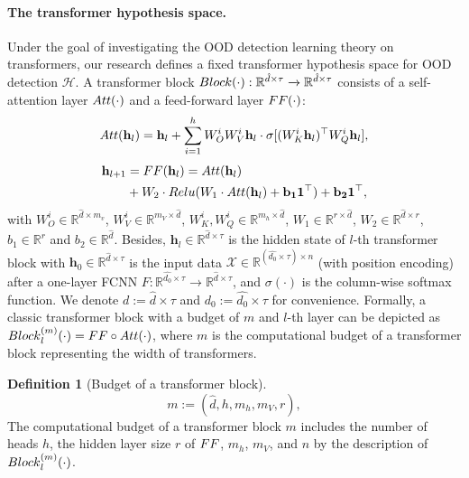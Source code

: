 \documentclass{article}
\theoremstyle{plain}
\theoremstyle{definition}
\newtheorem{definition}[theorem]{Definition}
\theoremstyle{remark}
\begin{document}
\paragraph{The transformer hypothesis space. }
Under the goal of investigating the OOD detection learning theory on transformers, our research defines a fixed transformer hypothesis space for OOD detection $\mathcal{H}$.
%
A transformer block ${\rm Block}(\cdot): \mathbb{R}^{\hat{d}\times \tau} \xrightarrow{} \mathbb{R}^{\hat{d}\times \tau}$ consists of a self-attention layer ${\rm Att}(\cdot)$ and a feed-forward layer ${\rm FF}(\cdot)$:
\begin{equation}
\small
    {\rm Att}(\mathbf{h}_{l}) = \mathbf{h}_{l} + \sum_{i=1}^h W_O^i W_V^i \mathbf{h}_{l} \cdot \sigma[(W_K^i \mathbf{h}_{l})^{\top} W_Q^i \mathbf{h}_{l}],
    \label{eq: Att}
\end{equation}
%
\begin{equation}
\small
\begin{aligned}
    \mathbf{h}_{l+1} &= {\rm FF}(\mathbf{h}_{l})
    = {\rm Att}(\mathbf{h}_{l}) \\
    &+ W_2\cdot {\rm Relu}(W_1 \cdot {\rm Att}(\mathbf{h}_{l})+ \mathbf{b_1} \mathbf{1}^{\top}) + \mathbf{b_2} \mathbf{1}^{\top},
\end{aligned}
    \label{eq:ff}
\end{equation}
with $W_O^i \in \mathbb{R}^{\hat{d}\times m_v}$, $W_V^i \in \mathbb{R}^{m_V\times \hat{d}}$, $W_K^i,W_Q^i \in \mathbb{R}^{m_h\times \hat{d}}$, $W_1\in \mathbb{R}^{r\times \hat{d}}$, $W_2\in \mathbb{R}^{\hat{d}\times r}$, $b_1 \in \mathbb{R}^{r}$ and $b_2 \in \mathbb{R}^{\hat{d}}$.
%
Besides, $\mathbf{h}_{l} \in \mathbb{R}^{\hat{d}\times \tau}$ is the hidden state of $l$-th transformer block with $\mathbf{h}_0\in \mathbb{R}^{\hat{d}\times \tau}$ is the input data $\mathcal{X} \in \mathbb{R}^{(\hat{d_0} \times\tau)\times n}$ (with position encoding) after a one-layer FCNN $F:\mathbb{R}^{\hat{d_0}\times \tau}\xrightarrow{}\mathbb{R}^{\hat{d}\times \tau}$, and $\sigma(\cdot)$ is the column-wise softmax function. We denote $d:=\hat{d}\times \tau$ and $d_0:=\hat{d_0}\times \tau$ for convenience. Formally, a classic transformer block with a budget of $m$ and $l$-th layer can be depicted as
${\rm Block}^{(m)}_l(\cdot) = {\rm FF} \circ {\rm Att}(\cdot)$, where $m$ is the computational budget of a transformer block representing the width of transformers.
\begin{definition}[Budget of a transformer block]
\begin{equation}
    m := (\hat{d}, h, m_h, m_V, r),
\end{equation}
The computational budget of a transformer block $m$ includes the number of heads $h$, the hidden layer size $r$ of ${\rm FF}$, $m_h$, $m_V$, and $n$ by the description of ${\rm Block}^{(m)}_l(\cdot)$.
\label{definition-budget}
\end{definition}
\end{document}
